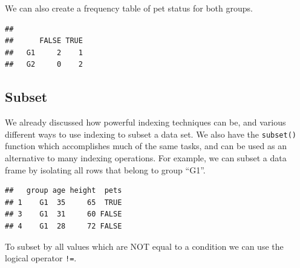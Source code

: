 \documentclass[
]{book}
\newenvironment{Shaded}{\begin{snugshade}}{\end{snugshade}}
\newcommand{\KeywordTok}[1]{\textcolor[rgb]{0.13,0.29,0.53}{\textbf{#1}}}
\newcommand{\NormalTok}[1]{#1}
\newcommand{\OperatorTok}[1]{\textcolor[rgb]{0.81,0.36,0.00}{\textbf{#1}}}
\newcommand{\StringTok}[1]{\textcolor[rgb]{0.31,0.60,0.02}{#1}}
\begin{document}
We can also create a frequency table of pet status for both groups.

\begin{Shaded}
\end{Shaded}

\begin{verbatim}
##     
##      FALSE TRUE
##   G1     2    1
##   G2     0    2
\end{verbatim}

\hypertarget{subset}{%
\subsection*{Subset}\label{subset}}

We already discussed how powerful indexing techniques can be, and various different ways to use indexing to subset a data set. We also have the \texttt{subset()} function which accomplishes much of the same tasks, and can be used as an alternative to many indexing operations. For example, we can subset a data frame by isolating all rows that belong to group ``G1''.

\begin{Shaded}
\end{Shaded}

\begin{verbatim}
##   group age height  pets
## 1    G1  35     65  TRUE
## 3    G1  31     60 FALSE
## 4    G1  28     72 FALSE
\end{verbatim}

To subset by all values which are NOT equal to a condition we can use the logical operator \texttt{!=}.

\begin{Shaded}
\end{Shaded}
\end{document}

